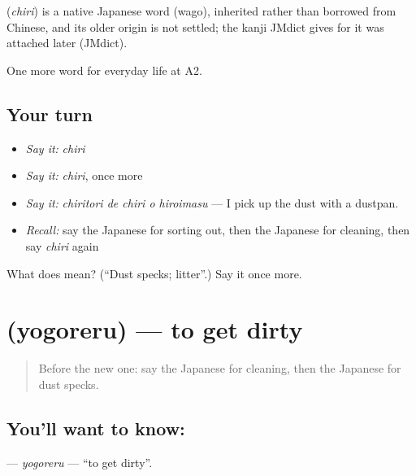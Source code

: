 \begin{cousinweb}
\textbf{} (\emph{chiri}) is a native Japanese word (wago), inherited rather than borrowed from Chinese, and its older origin is not settled; the kanji JMdict gives for it was attached later (JMdict).
\end{cousinweb}

\begin{grammarlens}[title={What you've built}]
One more word for everyday life at A2.
\end{grammarlens}

\subsection*{Your turn}
\begin{itemize}
\raggedright
  \item \emph{Say it:} \emph{chiri}
  \item \emph{Say it:} \emph{chiri}, once more
  \item \emph{Say it:} \emph{chiritori de chiri o hiroimasu} — I pick up the dust with a dustpan.
  \item \emph{Recall:} say the Japanese for sorting out, then the Japanese for cleaning, then say \emph{chiri} again
\end{itemize}

\begin{tcolorbox}[breakable,colback=teal!4,colframe=teal!35!black,title={Before you move on}]
What does  mean? (\textquotedblleft{}Dust specks; litter\textquotedblright{}.) Say it once more.
\end{tcolorbox}
\section[\texorpdfstring{\ja{よごれる} (yogoreru)}{よごれる (yogoreru)}]{ (yogoreru) — to get dirty}

\label{lesson:JA-C160-yogoreru}



\begin{quote}
Before the new one: say the Japanese for cleaning, then the Japanese for dust specks.
\end{quote}

\subsection*{You'll want to know: }
\textbf{} — \emph{yogoreru} — \textquotedblleft{}to get dirty\textquotedblright{}.

